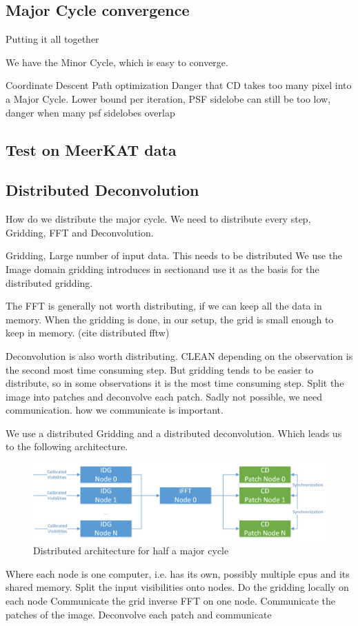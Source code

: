 \subsection{Major Cycle convergence}
Putting it all together

We have the Minor Cycle, which is easy to converge.

Coordinate Descent Path optimization \cite{friedman2010regularization}
Danger that CD takes too many pixel into a Major Cycle. Lower bound per iteration, PSF sidelobe
  can still be too low, danger when many psf sidelobes overlap

\subsection{Test on MeerKAT data}

\subsection{Distributed Deconvolution}
How do we distribute the major cycle. We need to distribute every step, Gridding, FFT and Deconvolution.

Gridding, Large number of input data. This needs to be distributed
We use the Image domain gridding introduces in sectionand use it as the basis for the distributed gridding.

The FFT is generally not worth distributing, if we can keep all the data in memory. When the gridding is done, in our setup, the grid is small enough to keep in memory. (cite distributed fftw)

Deconvolution is also worth distributing. CLEAN depending on the observation is the second most time consuming step. But gridding tends to be easier to distribute, so in some observations it is the most time consuming step.
Split the image into patches and deconvolve each patch.
Sadly not possible, we need communication. how we communicate is important.

We use a distributed Gridding and a distributed deconvolution. Which leads us to the following architecture.

\begin{figure}[h]
	\centering
	\includegraphics[width=0.80\linewidth]{./chapters/03.distribution/distributed_architecture.png}
	\caption{Distributed architecture for half a major cycle}
	\label{dist:architecture:fig}
\end{figure}

Where each node is one computer, i.e. has its own, possibly multiple cpus and its shared memory.
Split the input visibilities onto nodes. 
Do the gridding locally on each node
Communicate the grid
inverse FFT on one node.
Communicate the patches of the image.
Deconvolve each patch and communicate
